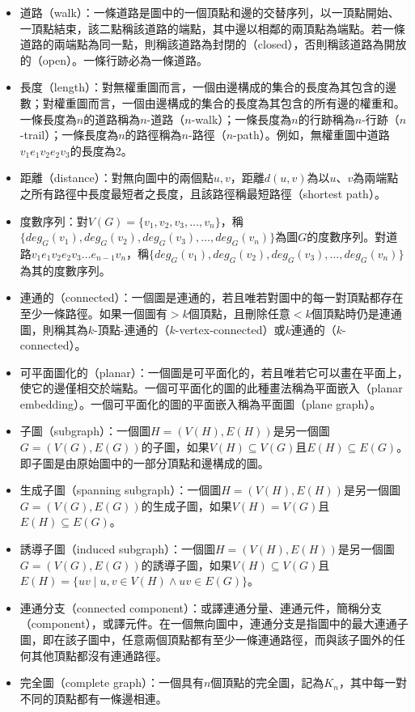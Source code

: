 \documentclass[a4paper,12pt]{report}
\begin{document}
\begin{itemize}
\item 道路（walk）：一條道路是圖中的一個頂點和邊的交替序列，以一頂點開始、一頂點結束，該二點稱該道路的端點，其中邊以相鄰的兩頂點為端點。若一條道路的兩端點為同一點，則稱該道路為封閉的（closed），否則稱該道路為開放的（open）。一條行跡必為一條道路。
\item 長度（length）：對無權重圖而言，一個由邊構成的集合的長度為其包含的邊數；對權重圖而言，一個由邊構成的集合的長度為其包含的所有邊的權重和。一條長度為$n$的道路稱為$n$-道路（$n$-walk）；一條長度為$n$的行跡稱為$n$-行跡（$n$-trail）；一條長度為$n$的路徑稱為$n$-路徑（$n$-path）。例如，無權重圖中道路$v_1e_1v_2e_2v_3$的長度為2。
\item 距離（distance）：對無向圖中的兩個點$u ,v$，距離$d(u, v)$為以$u$、$v$為兩端點之所有路徑中長度最短者之長度，且該路徑稱最短路徑（shortest path）。
\item 度數序列：對$V(G)=\{v_1, v_2, v_3, \ldots, v_n\}$，稱$\{deg_G(v_1), deg_G(v_2), deg_G(v_3), \ldots, deg_G(v_n)\}$為圖$G$的度數序列。對道路$v_1e_1v_2e_2v_3\ldots e_{n-1}v_n$，稱$\{deg_G(v_1), deg_G(v_2), deg_G(v_3), \ldots, deg_G(v_n)\}$為其的度數序列。
\item 連通的（connected）：一個圖是連通的，若且唯若對圖中的每一對頂點都存在至少一條路徑。如果一個圖有$>k$個頂點，且刪除任意$<k$個頂點時仍是連通圖，則稱其為$k$-頂點-連通的（$k$-vertex-connected）或$k$連通的（$k$-connected）。
\item 可平面圖化的（planar）：一個圖是可平面化的，若且唯若它可以畫在平面上，使它的邊僅相交於端點。一個可平面化的圖的此種畫法稱為平面嵌入（planar embedding）。一個可平面化的圖的平面嵌入稱為平面圖（plane graph）。
\item 子圖（subgraph）：一個圖$H=(V(H), E(H))$是另一個圖$G=(V(G), E(G))$的子圖，如果$V(H)\subseteq V(G)$且$E(H)\subseteq E(G)$。即子圖是由原始圖中的一部分頂點和邊構成的圖。
\item 生成子圖（spanning subgraph）：一個圖$H=(V(H), E(H))$是另一個圖$G=(V(G), E(G))$的生成子圖，如果$V(H)=V(G)$且$E(H)\subseteq E(G)$。
\item 誘導子圖（induced subgraph）：一個圖$H=(V(H), E(H))$是另一個圖$G=(V(G), E(G))$的誘導子圖，如果$V(H)\subseteq V(G)$且$E(H)=\{uv\mid u, v\in V(H)\wedge uv\in E(G)\}$。
\item 連通分支（connected component）：或譯連通分量、連通元件，簡稱分支（component），或譯元件。在一個無向圖中，連通分支是指圖中的最大連通子圖，即在該子圖中，任意兩個頂點都有至少一條連通路徑，而與該子圖外的任何其他頂點都沒有連通路徑。
\item 完全圖（complete graph）：一個具有$n$個頂點的完全圖，記為$K_n$，其中每一對不同的頂點都有一條邊相連。

\end{itemize}
\end{document}
